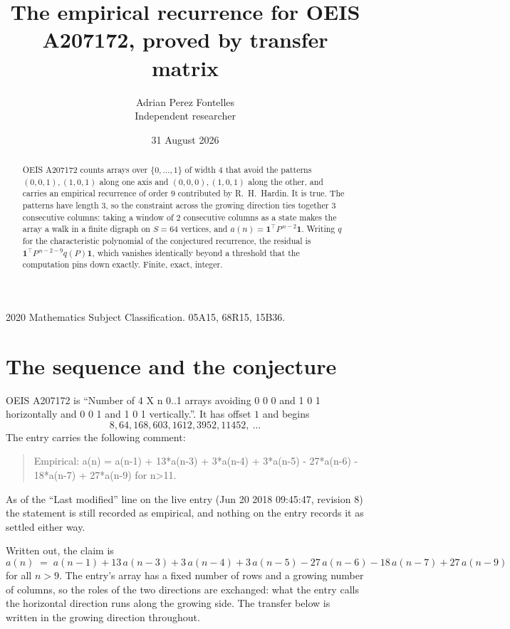 \documentclass[11pt,a4paper]{article}
\title{The empirical recurrence for OEIS A207172, proved by transfer matrix}
\author{Adrian Perez Fontelles\\ \small Independent researcher}
\date{31 August 2026}
\theoremstyle{plain}
\theoremstyle{definition}
\begin{document}
\maketitle

\begin{abstract}
OEIS A207172 counts arrays over $\{0,\dots,1\}$ of width $4$ that avoid the patterns
$(0,0,1), (1,0,1)$ along one axis and $(0,0,0), (1,0,1)$ along the other, and carries an empirical recurrence of
order $9$ contributed by R.~H.~Hardin. It is true. The patterns have length $3$, so
the constraint across the growing direction ties together $3$ consecutive columns: taking a
window of $2$ consecutive columns as a state makes the array a walk in a finite digraph
on $S=64$ vertices, and $a(n)=\mathbf{1}^{\!\top}P^{\,n-2}\mathbf{1}$. Writing $q$
for the characteristic polynomial of the conjectured recurrence, the residual is
$\mathbf{1}^{\!\top}P^{\,n-2-9}q(P)\mathbf{1}$, which vanishes identically
beyond a threshold that the computation pins down exactly. Finite, exact, integer.
\end{abstract}

\noindent\small 2020 Mathematics Subject Classification. 05A15, 68R15, 15B36.\normalsize

\section{The sequence and the conjecture}

OEIS A207172 is ``Number of 4 X n 0..1 arrays avoiding 0 0 0 and 1 0 1 horizontally and 0 0 1 and 1 0 1 vertically.''. It has offset
$1$ and begins
\[
8, 64, 168, 603, 1612, 3952, 11452,\ \dots
\]
The entry carries the following comment:
\begin{quote}\small
Empirical: a(n) = a(n-1) + 13*a(n-3) + 3*a(n-4) + 3*a(n-5) - 27*a(n-6) - 18*a(n-7) + 27*a(n-9) for n>11.
\end{quote}
As of the ``Last modified'' line on the live entry (Jun 20 2018 09:45:47, revision
8) the statement is still recorded as empirical, and nothing on the entry
records it as settled either way.

Written out, the claim is
\begin{equation}\label{eq:conj}
a(n)\;=\;a(n-1) + 13\,a(n-3) + 3\,a(n-4) + 3\,a(n-5) - 27\,a(n-6) - 18\,a(n-7) + 27\,a(n-9)
\end{equation}
for all $n>9$. The entry's array has a fixed number of rows and a growing number of
columns, so the roles of the two directions are exchanged: what the entry calls the
horizontal direction runs along the growing side. The transfer below is written in the
growing direction throughout.
\end{document}
